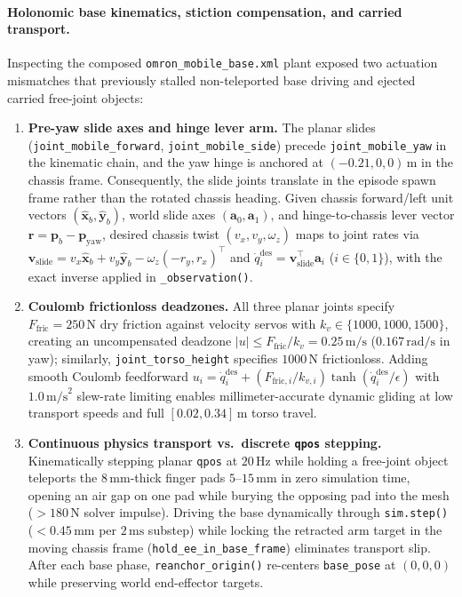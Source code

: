 \paragraph{Holonomic base kinematics, stiction compensation, and carried transport.}
Inspecting the composed \texttt{omron\_mobile\_base.xml} plant exposed two
actuation mismatches that previously stalled non-teleported base driving and
ejected carried free-joint objects:
\begin{enumerate}
  \item \textbf{Pre-yaw slide axes and hinge lever arm.}
  The planar slides (\texttt{joint\_mobile\_forward}, \texttt{joint\_mobile\_side})
  precede \texttt{joint\_mobile\_yaw} in the kinematic chain, and the yaw hinge
  is anchored at $(-0.21, 0, 0)\,\text{m}$ in the chassis frame. Consequently,
  the slide joints translate in the episode spawn frame rather than the rotated
  chassis heading. Given chassis forward/left unit vectors
  $(\hat{\mathbf{x}}_b, \hat{\mathbf{y}}_b)$, world slide axes
  $(\mathbf{a}_0, \mathbf{a}_1)$, and hinge-to-chassis lever vector
  $\mathbf{r} = \mathbf{p}_b - \mathbf{p}_{\text{yaw}}$, desired chassis twist
  $(v_x, v_y, \omega_z)$ maps to joint rates via
  $\mathbf{v}_{\text{slide}} = v_x \hat{\mathbf{x}}_b + v_y \hat{\mathbf{y}}_b - \omega_z (-r_y, r_x)^\top$
  and $\dot{q}_i^{\text{des}} = \mathbf{v}_{\text{slide}}^\top \mathbf{a}_i$
  ($i \in \{0, 1\}$), with the exact inverse applied in \texttt{\_observation()}.
  \item \textbf{Coulomb frictionloss deadzones.}
  All three planar joints specify $F_{\text{fric}} = 250\,\text{N}$ dry friction
  against velocity servos with $k_v \in \{1000, 1000, 1500\}$, creating an
  uncompensated deadzone $|u| \le F_{\text{fric}} / k_v = 0.25\,\text{m/s}$
  ($0.167\,\text{rad/s}$ in yaw); similarly, \texttt{joint\_torso\_height}
  specifies $1000\,\text{N}$ frictionloss. Adding smooth Coulomb feedforward
  $u_i = \dot{q}_i^{\text{des}} + (F_{\text{fric},i} / k_{v,i})\tanh(\dot{q}_i^{\text{des}} / \epsilon)$
  with $1.0\,\text{m/s}^2$ slew-rate limiting enables millimeter-accurate dynamic
  gliding at low transport speeds and full $[0.02, 0.34]\,\text{m}$ torso travel.
  \item \textbf{Continuous physics transport vs.\ discrete \texttt{qpos} stepping.}
  Kinematically stepping planar \texttt{qpos} at $20\,\text{Hz}$ while holding a
  free-joint object teleports the $8\,\text{mm}$-thick finger pads $5\text{--}15\,\text{mm}$
  in zero simulation time, opening an air gap on one pad while burying the
  opposing pad into the mesh ($>180\,\text{N}$ solver impulse). Driving the base
  dynamically through \texttt{sim.step()} ($<0.45\,\text{mm}$ per $2\,\text{ms}$
  substep) while locking the retracted arm target in the moving chassis frame
  (\texttt{hold\_ee\_in\_base\_frame}) eliminates transport slip. After each base
  phase, \texttt{reanchor\_origin()} re-centers \texttt{base\_pose} at $(0,0,0)$
  while preserving world end-effector targets.
\end{enumerate}

